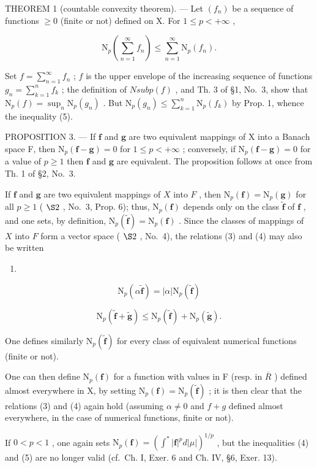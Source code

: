THEOREM 1 (countable convexity theorem). --- Let \((f_n)\) be a sequence of functions \(\geqslant 0\) (finite or not) defined on X. For \(1 \leqslant p < +\infty\) ,

\[
\mathrm{N} _ {p} \left(\sum_ {n = 1} ^ {\infty} f _ {n}\right) \leqslant \sum_ {n = 1} ^ {\infty} \mathrm{N} _ {p} (f _ {n}).\tag{5}
\]

Set \(f = \sum_{n=1}^{\infty} f_n\) ; \(f\) is the upper envelope of the increasing sequence of functions \(g_n = \sum_{k=1}^{n} f_k\) ; the definition of \(N sub p(f)\) , and Th. 3 of §1, No.~3, show that \(\mathrm{N}_{p}(f)=\sup_{n}\mathrm{N}_{p}(g_{n})\) . But \(\mathrm{N}_{p}(g_{n})\leqslant\sum_{k=1}^{n}\mathrm{N}_{p}(f_{k})\) by Prop. 1, whence the inequality (5).

PROPOSITION 3. --- If \(\mathbf{f}\) and \(\mathbf{g}\) are two equivalent mappings of X into a Banach space F, then \(\mathrm{N}_p(\mathbf{f} - \mathbf{g}) = 0\) for \(1 \leqslant p < +\infty\) ; conversely, if \(\mathrm{N}_p(\mathbf{f} - \mathbf{g}) = 0\) for a value of \(p \geqslant 1\) then \(\mathbf{f}\) and \(\mathbf{g}\) are equivalent. The proposition follows at once from Th. 1 of §2, No.~3.

If \(\mathbf{f}\) and \(\mathbf{g}\) are two equivalent mappings of \(X\) into \(F\) , then \(\mathrm{N}_p(\mathbf{f}) = \mathrm{N}_p(\mathbf{g})\) for all \(p \geqslant 1\) ( \(\S 2\) , No.~3, Prop. 6); thus, \(\mathrm{N}_p(\mathbf{f})\) depends only on the class \(\widetilde{\mathbf{f}}\) of \(\mathbf{f}\) , and one sets, by definition, \(\mathrm{N}_p(\widetilde{\mathbf{f}}) = \mathrm{N}_p(\mathbf{f})\) . Since the classes of mappings of \(X\) into \(F\) form a vector space ( \(\S 2\) , No.~4), the relations (3) and (4) may also be written

\begin{enumerate}
\def\labelenumi{(\arabic{enumi})}
\setcounter{enumi}{5}
\tightlist
\item
\end{enumerate}

\[
\mathrm{N} _ {p} (\alpha \widetilde {\mathbf {f}}) = | \alpha | \mathrm{N} _ {p} (\widetilde {\mathbf {f}})\tag{7}
\]

\[
\mathrm{N} _ {p} (\widetilde {\mathbf {f}} + \widetilde {\mathbf {g}}) \leqslant \mathrm{N} _ {p} (\widetilde {\mathbf {f}}) + \mathrm{N} _ {p} (\widetilde {\mathbf {g}}).
\]

One defines similarly \(\mathrm{N}_{p}(\tilde{\mathbf{f}})\) for every class of equivalent numerical functions (finite or not).

One can then define \(\mathrm{N}_{p}(\mathbf{f})\) for a function with values in F (resp. in \(\overline{R}\) ) defined almost everywhere in X, by setting \(\mathrm{N}_{p}(\mathbf{f})=\mathrm{N}_{p}(\widetilde{\mathbf{f}})\) ; it is then clear that the relations (3) and (4) again hold (assuming \(\alpha\neq0\) and \(f+g\) defined almost everywhere, in the case of numerical functions, finite or not).

If \(0 < p < 1\) , one again sets \(\mathrm{N}_p(\mathbf{f}) = (\int^* |\mathbf{f}|^p d|\mu|)^{1/p}\) , but the inequalities (4) and (5) are no longer valid (cf.~Ch. I, Exer. 6 and Ch. IV, §6, Exer. 13).

